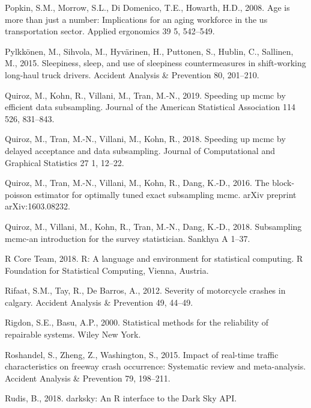 \documentclass[12pt]{book}
\numberwithin{equation}{chapter}
\begin{document}
\leavevmode\hypertarget{ref-popkin2008age}{}%
Popkin, S.M., Morrow, S.L., Di Domenico, T.E., Howarth, H.D., 2008. Age is more than just a number: Implications for an aging workforce in the us transportation sector. Applied ergonomics 39 5, 542--549.

\leavevmode\hypertarget{ref-pylkkonen2015sleepiness}{}%
Pylkkönen, M., Sihvola, M., Hyvärinen, H., Puttonen, S., Hublin, C., Sallinen, M., 2015. Sleepiness, sleep, and use of sleepiness countermeasures in shift-working long-haul truck drivers. Accident Analysis \& Prevention 80, 201--210.

\leavevmode\hypertarget{ref-quiroz2019speeding}{}%
Quiroz, M., Kohn, R., Villani, M., Tran, M.-N., 2019. Speeding up mcmc by efficient data subsampling. Journal of the American Statistical Association 114 526, 831--843.

\leavevmode\hypertarget{ref-quiroz2018speeding}{}%
Quiroz, M., Tran, M.-N., Villani, M., Kohn, R., 2018. Speeding up mcmc by delayed acceptance and data subsampling. Journal of Computational and Graphical Statistics 27 1, 12--22.

\leavevmode\hypertarget{ref-quiroz2016block}{}%
Quiroz, M., Tran, M.-N., Villani, M., Kohn, R., Dang, K.-D., 2016. The block-poisson estimator for optimally tuned exact subsampling mcmc. arXiv preprint arXiv:1603.08232.

\leavevmode\hypertarget{ref-quiroz2018subsampling}{}%
Quiroz, M., Villani, M., Kohn, R., Tran, M.-N., Dang, K.-D., 2018. Subsampling mcmc-an introduction for the survey statistician. Sankhya A 1--37.

\leavevmode\hypertarget{ref-Rcitation}{}%
R Core Team, 2018. R: A language and environment for statistical computing. R Foundation for Statistical Computing, Vienna, Austria.

\leavevmode\hypertarget{ref-rifaat2012severity}{}%
Rifaat, S.M., Tay, R., De Barros, A., 2012. Severity of motorcycle crashes in calgary. Accident Analysis \& Prevention 49, 44--49.

\leavevmode\hypertarget{ref-rigdon2000statistical}{}%
Rigdon, S.E., Basu, A.P., 2000. Statistical methods for the reliability of repairable systems. Wiley New York.

\leavevmode\hypertarget{ref-roshandel2015impact}{}%
Roshandel, S., Zheng, Z., Washington, S., 2015. Impact of real-time traffic characteristics on freeway crash occurrence: Systematic review and meta-analysis. Accident Analysis \& Prevention 79, 198--211.

\leavevmode\hypertarget{ref-hrbrmstr}{}%
Rudis, B., 2018. darksky: An R interface to the Dark Sky API.
\end{document}
